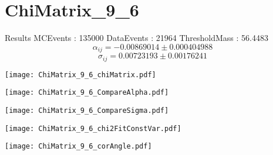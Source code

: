 \documentclass[a4paper,12pt]{article}
\begin{document}
\section{ChiMatrix\_9\_6}
\begin{minipage}{0.49\linewidth} Results \newline
MCEvents : 135000\newline
DataEvents : 21964 \newline
ThresholdMass : 56.4483\\
$$\alpha_{ij} = -0.00869014\pm 0.000404988$$
$$\sigma_{ij} = 0.00723193\pm 0.00176241$$
\end{minipage}\hfill
\begin{minipage}{0.49\linewidth} 
\texttt{[image: ChiMatrix\_9\_6\_chiMatrix.pdf]}\\
\end{minipage}
\hfill
\begin{minipage}{0.49\linewidth} 
\texttt{[image: ChiMatrix\_9\_6\_CompareAlpha.pdf]}\\
\end{minipage}
\hfill
\begin{minipage}{0.49\linewidth} 
\texttt{[image: ChiMatrix\_9\_6\_CompareSigma.pdf]}\\
\end{minipage}
\begin{minipage}{0.49\linewidth} 
\texttt{[image: ChiMatrix\_9\_6\_chi2FitConstVar.pdf]}\\
\end{minipage}
\hfill
\begin{minipage}{0.49\linewidth} 
\texttt{[image: ChiMatrix\_9\_6\_corAngle.pdf]}\\
\end{minipage}
\end{document}
